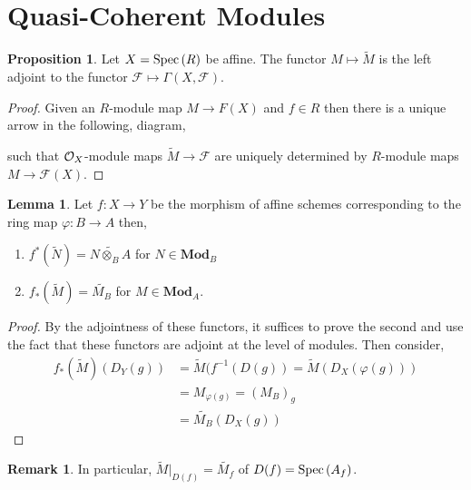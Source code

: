 \documentclass[12pt]{extarticle}
\theoremstyle{definition}
\newtheorem{lemma}[theorem]{Lemma}
\newtheorem{proposition}[theorem]{Proposition}
\newtheorem{remark}{Remark}
\newcommand{\F}{\mathcal{F}}
\begin{document}
\section{Quasi-Coherent Modules}

\renewcommand{\Mod}[1]{\mathbf{Mod}_{#1}}

\begin{proposition}
Let $X = \mathrm{Spec}\left(R\right)$ be affine. The functor $M \mapsto \widetilde{M}$ is the left adjoint to the functor $\F \mapsto \Gamma(X, \F)$.  
\end{proposition}

\begin{proof}
Given an $R$-module map $M \to F(X)$ and $f \in R$ then there is a unique arrow in the following, diagram,
\begin{center}
\end{center}
such that $\mathcal{O}_{X}$-module maps $\widetilde{M} \to \F$ are uniquely determined by $R$-module maps $M \to \F(X)$.
\end{proof}

\begin{lemma}
Let $f : X \to Y$ be the morphism of affine schemes corresponding to the ring map $\varphi : B \to A$ then,
\begin{enumerate}
\item $f^*(\widetilde{N}) = \widetilde{N \otimes_B A}$ for $N \in \Mod{B}$
\item $f_*(\widetilde{M}) = \widetilde{M_B}$ for $M \in \Mod{A}$. 
\end{enumerate}
\end{lemma}

\begin{proof}
By the adjointness of these functors, it suffices to prove the second and use the fact that these functors are adjoint at the level of modules. Then consider,
\begin{align*}
f_*(\widetilde{M})(D_Y(g)) & = \widetilde{M}(f^{-1}(D(g)) = \widetilde{M}(D_X(\varphi(g))) 
\\
& = M_{\varphi(g)} = (M_B)_g 
\\
& = \widetilde{M_B}(D_X(g))
\end{align*}
\end{proof}

\begin{remark}
In particular, $\widetilde{M}|_{D(f)} = \widetilde{M_f}$ of $D(f) = \mathrm{Spec}\left(A_f\right)$. 
\end{remark}
\end{document}
